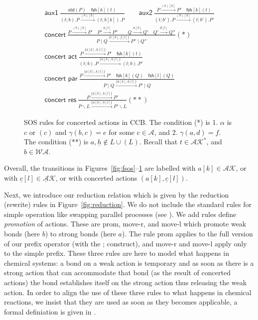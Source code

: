 \documentclass[runningheads]{llncs}
\newcommand{\Rule}[2]{\displaystyle{\frac{#1}{#2}}}
\newcommand{\paral}{\; \vert \;}
\newcommand{\mAK}{\mathcal{AK}}
\newcommand{\umAK}{\underline{\mathcal{A}}\mathcal{K}}
\newcommand{\std}[1]{\mathsf{std}(#1)}
\newcommand{\fresh}[2]{\mathsf{fsh}[#1](#2)}
\newcommand{\rulename}[1]{\textsf{#1}}
\begin{document}
\begin{figure}
\[
\begin{array}{l}
\rulename{aux1}\ 
\Rule{\std{P} \quad \fresh{k}{t}}
{(t;b).P \xrightarrow{(b)[k]}(t;b[k]).P}
\qquad
\rulename{aux2}\
\Rule
{P \xrightarrow{(b)[k]} P' \quad \fresh{k}{t}}
{(t;b').P \xrightarrow{(b)[k]} (t;b').P'}
\\[25pt]
\rulename{concert}\ 
\Rule
{P\xrightarrow{(b)[k]}P' \quad P'\xrightarrow{\underline{a}[l]}P'' \qquad Q\xrightarrow{\alpha[k]}Q' 
  \quad Q'\xrightarrow{\underline{d}[l]}Q''%
 }
{P \paral Q\xrightarrow{\{e[k],\underline{f}[l]\}} P'' \paral Q''} (*)\\[25pt]
\rulename{concert act}\
\Rule
{P \xrightarrow{\{{a}[k], \underline{h}[l]\}} P' \quad \fresh{k}{t}}
{(t;b).P \xrightarrow{\{{a}[k], \underline{h}[l]\}} (t;b).P'}\\[25pt]
\rulename{concert par}\
\Rule
{P \xrightarrow{\{{a}[k], \underline{h}[l]\}} P'\quad \fresh{k}{Q} \quad \fresh{l}{Q}}
{P \paral Q \xrightarrow{\{{a}[k], \underline{h}[l]\}} P' \paral Q}\\[25pt]
\rulename{concert res}\
\Rule
{P \xrightarrow{\{{a}[k], \underline{h}[l]\}} P'}
{P\backslash L \xrightarrow{\{{a}[k], \underline{h}[l]\}} P'\backslash L} (**)
%
\end{array}
\] 
\caption[SOS rules for concerted actions in CCB.]{SOS rules for concerted actions in CCB. The condition (*) is 1. $\alpha$ is $c$ or $(c)$ 
and $\gamma(b,c)=e$ for some $c\in \mathcal{A}$, and 2. $\gamma(a,d)=f$. 
The condition (**) is $a, \underline{h}  \notin L \cup (L)$. 
Recall that $t \in \mAK^*$, and $b \in \mathcal{WA}$.} \label{fig:csos}
\end{figure}
Overall, the transitions in Figures~\ref{fig:fsos}--\ref{fig:csos} are labelled with $a[k] \in \mAK$, or with 
$\underline{c}[l] \in \umAK$, or with concerted actions $(a[k], \underline{c}[l])$.

Next, we introduce our reduction relation which is given by the reduction (rewrite) rules 
in Figure~\ref{fig:reduction}. We do not include the standard rules for simple operation like swapping parallel processes (see \cite{KUHN201818}). We add rules define {\em promotion} of actions. These are \rulename{prom}, \rulename{move-r}, and \rulename{move-l} which  
promote weak bonds (here $b$) to strong bonds (here $a$).
The rule \rulename{prom} applies to the full version of our prefix operator (with the ; construct), and
\rulename{move-r} and \rulename{move-l} apply only to the simple prefix.
These three rules are here to model what happens in chemical systems: a bond on a weak action is 
temporary and as soon as there is a strong action that can accommodate that bond (as the result
of concerted actions) the bond establishes itself on the strong action thus releasing the weak action.
In order to align the use of these three rules to what happens in chemical reactions, we insist
that they are used as soon as they becomes applicable, a formal definiation is given in \cite{KUHN201818}.
\end{document}
